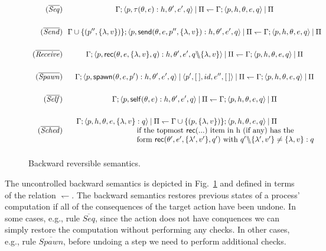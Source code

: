 \documentclass[runningheads]{llncs}
\newcommand{\sslash}{\mathbin{\mkern-4mu \backslash \mkern-6mu \backslash \mkern-4mu}}
\newcommand{\comp}{\:|\:}
\newcommand{\set}[1]{\{#1\}}
\newcommand{\ms}[1]{\mathsf{#1}}
\newcommand{\lh}{\leftharpoondown}
\let\l=\langle
\let\r=\rangle
\newcommand{\nill}{[\:]}
\newcommand{\ol}[1]{\overline{#1}}
\begin{document}
\begin{figure}[t]
\centering
\small
  $
  \begin{array}{r@{~~}c}
  	
  (\mathit{\overline{Seq}}) & \displaystyle
  \Gamma; \l p, \tau (\theta,e):h,\theta',e',q \r \comp \Pi 
  	\lh
  \Gamma; \l p, h,\theta,e,q \r \comp \Pi \\[4ex] 
  
  (\mathit{\overline{Send}}) & \displaystyle
  \Gamma \cup \{(p'',\set{\lambda, v})\}; \l p, \ms{send}(\theta,e,p'',\set{\lambda,v}):h,\theta',e',q \r \comp \Pi 
  	\lh
  \Gamma; \l p, h,\theta,e,q \r \comp \Pi \\[4ex] 
 
  (\mathit{\overline{Receive}}) & \displaystyle
  \Gamma; \l p, \ms{rec}(\theta,e,\set{\lambda,v},q):h,\theta',e',q \sslash \set{\lambda,v} \r \comp \Pi 
  	\lh
  \Gamma; \l p, h,\theta,e,q \r \comp \Pi \\[4ex] 
   
  (\mathit{\overline{Spawn}}) & {\displaystyle
    \Gamma; \l p, \ms{spawn}(\theta,e,p'):h,\theta',e',q \r \comp \l p', \nill, id,e'',\nill \r \comp \Pi 
  	\lh
  \Gamma; \l p, h,\theta,e,q \r \comp \Pi} \\[4ex] 
  
  (\mathit{\overline{Self}}) & \displaystyle
  \Gamma; \l p, \ms{self}(\theta,e):h,\theta',e',q \r \comp \Pi 
  	\lh
  \Gamma; \l p, h,\theta,e,q \r \comp \Pi \\[4ex] 
    
  (\mathit{\overline{Sched}}) & \displaystyle
  {\begin{array}{l@{~}l}
   	\Gamma; \l p, h,\theta,e,\set{\lambda,v}:q \r \comp \Pi 
  	\lh
  \Gamma\cup \set{(p,\set{\lambda,v})} ; \l p, h,\theta,e,q \r \comp \Pi \\
  	  \hskip 8em \text{if the topmost } \ms{rec}(...) \text{ item in h (if any) has the}\\
  	  \hskip 8em \text{form } \ms{rec}(\theta',e',\{\lambda',v'\},q') \text{ with } q'\sslash \set{\lambda',v'}\not= \set{\lambda,v}:q
  	\end{array}}\\[4ex] 
  \end{array}
  $
\caption{Backward reversible semantics.}
\label{fig:bwd-semantics}
\end{figure}


The uncontrolled backward semantics is depicted in Fig.~\ref{fig:bwd-semantics}
and defined in terms of the relation $\lh$. The backward semantics restores
previous states of a process' computation if all of the consequences of the
target action have been undone. In some cases, e.g., rule $\ol{Seq}$, since the
action does not have conquences we can simply restore the computation without
performing any checks. In other cases, e.g., rule $\ol{Spawn}$, before undoing a step
we need to perform additional checks.
\end{document}
